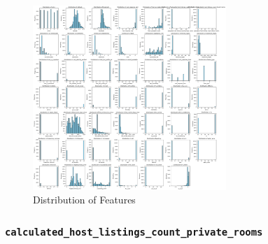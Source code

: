 \documentclass[12pt]{article}
\begin{document}
\begin{figure}[H]
\centering
\includegraphics[width=0.65\textwidth]{images/df_distribution.png}
\caption{Distribution of Features}
\label{fig:df_distribution}
\end{figure}
    

\subsubsection{\texttt{calculated\_host\_listings\_count\_private\_rooms}}
\end{document}

